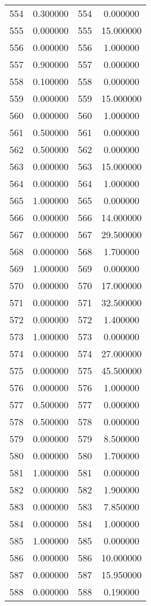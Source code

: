 \documentclass[12pt]{article}
\begin{document}
\begin{longtable}{@{}cccc@{}}
554 & 0.300000 & 554 & 0.000000 \\
555 & 0.000000 & 555 & 15.000000 \\
556 & 0.000000 & 556 & 1.000000 \\
557 & 0.900000 & 557 & 0.000000 \\
558 & 0.100000 & 558 & 0.000000 \\
559 & 0.000000 & 559 & 15.000000 \\
560 & 0.000000 & 560 & 1.000000 \\
561 & 0.500000 & 561 & 0.000000 \\
562 & 0.500000 & 562 & 0.000000 \\
563 & 0.000000 & 563 & 15.000000 \\
564 & 0.000000 & 564 & 1.000000 \\
565 & 1.000000 & 565 & 0.000000 \\
566 & 0.000000 & 566 & 14.000000 \\
567 & 0.000000 & 567 & 29.500000 \\
568 & 0.000000 & 568 & 1.700000 \\
569 & 1.000000 & 569 & 0.000000 \\
570 & 0.000000 & 570 & 17.000000 \\
571 & 0.000000 & 571 & 32.500000 \\
572 & 0.000000 & 572 & 1.400000 \\
573 & 1.000000 & 573 & 0.000000 \\
574 & 0.000000 & 574 & 27.000000 \\
575 & 0.000000 & 575 & 45.500000 \\
576 & 0.000000 & 576 & 1.000000 \\
577 & 0.500000 & 577 & 0.000000 \\
578 & 0.500000 & 578 & 0.000000 \\
579 & 0.000000 & 579 & 8.500000 \\
580 & 0.000000 & 580 & 1.700000 \\
581 & 1.000000 & 581 & 0.000000 \\
582 & 0.000000 & 582 & 1.900000 \\
583 & 0.000000 & 583 & 7.850000 \\
584 & 0.000000 & 584 & 1.000000 \\
585 & 1.000000 & 585 & 0.000000 \\
586 & 0.000000 & 586 & 10.000000 \\
587 & 0.000000 & 587 & 15.950000 \\
588 & 0.000000 & 588 & 0.190000 \\

\end{longtable}
\end{document}
